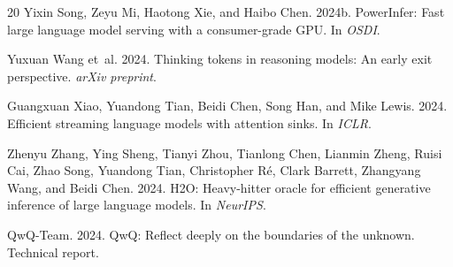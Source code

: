 \documentclass[11pt,a4paper]{article}
\begin{document}
\begin{thebibliography}{20}
Yixin Song, Zeyu Mi, Haotong Xie, and Haibo Chen. 2024b.
PowerInfer: Fast large language model serving with a consumer-grade GPU.
In \emph{OSDI}.

Yuxuan Wang et~al. 2024.
Thinking tokens in reasoning models: An early exit perspective.
\emph{arXiv preprint}.

Guangxuan Xiao, Yuandong Tian, Beidi Chen, Song Han, and Mike Lewis. 2024.
Efficient streaming language models with attention sinks.
In \emph{ICLR}.

Zhenyu Zhang, Ying Sheng, Tianyi Zhou, Tianlong Chen, Lianmin Zheng, Ruisi Cai, Zhao Song, Yuandong Tian, Christopher R\'{e}, Clark Barrett, Zhangyang Wang, and Beidi Chen. 2024.
H2O: Heavy-hitter oracle for efficient generative inference of large language models.
In \emph{NeurIPS}.

QwQ-Team. 2024.
QwQ: Reflect deeply on the boundaries of the unknown.
Technical report.

\end{thebibliography}
\end{document}
